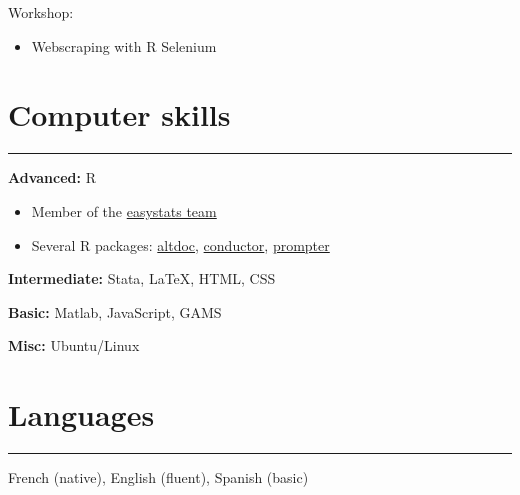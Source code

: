 \documentclass{article}
\newcommand{\sectionline}{%
  \vspace{-0.5cm}%
  \par\noindent\rule{\textwidth}{0.4pt}%
  \vspace{0.3cm}%
}
\let\xsection=\section
\renewcommand{\section}[1]{%
  \vspace{0.4cm}%
  \xsection*{#1}%
  \sectionline%
}
\def\tightlist{}
\begin{document}
Workshop:

\begin{itemize}
\tightlist
\item
  Webscraping with R Selenium
\end{itemize}

\hypertarget{computer-skills}{%
\section{Computer skills}\label{computer-skills}}

\textbf{Advanced:} R

\begin{itemize}
\item
  Member of the \href{https://github.com/easystats/}{easystats team}
\item
  Several R packages:
  \href{https://github.com/etiennebacher/altdoc}{altdoc},
  \href{https://github.com/etiennebacher/conductor}{conductor},
  \href{https://github.com/etiennebacher/prompter}{prompter}
\end{itemize}

\textbf{Intermediate:} Stata, LaTeX, HTML, CSS

\textbf{Basic:} Matlab, JavaScript, GAMS

\textbf{Misc:} Ubuntu/Linux

\hypertarget{languages}{%
\section{Languages}\label{languages}}

French (native), English (fluent), Spanish (basic)
\end{document}
